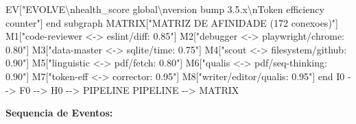 \documentclass[
  12pt,
]{article}
\newenvironment{Shaded}{}{}
\newcommand{\NormalTok}[1]{#1}
\begin{document}
\begin{Shaded}
\begin{Highlighting}[]
\NormalTok{EV["EVOLVE\textbackslash{}nhealth\_score global\textbackslash{}nversion bump 3.5.x\textbackslash{}nToken efficiency counter"]}
\NormalTok{end}
\NormalTok{subgraph MATRIX["MATRIZ DE AFINIDADE (172 conexoes)"]}
\NormalTok{M1["code{-}reviewer \textless{}{-}\textgreater{} eslint/diff: 0.85"]}
\NormalTok{M2["debugger \textless{}{-}\textgreater{} playwright/chrome: 0.80"]}
\NormalTok{M3["data{-}master \textless{}{-}\textgreater{} sqlite/time: 0.75"]}
\NormalTok{M4["scout \textless{}{-}\textgreater{} filesystem/github: 0.90"]}
\NormalTok{M5["linguistic \textless{}{-}\textgreater{} pdf/fetch: 0.80"]}
\NormalTok{M6["qualis \textless{}{-}\textgreater{} pdf/seq{-}thinking: 0.90"]}
\NormalTok{M7["token{-}eff \textless{}{-}\textgreater{} corrector: 0.95"]}
\NormalTok{M8["writer/editor/qualis: 0.95"]}
\NormalTok{end}
\NormalTok{I0 {-}{-}\textgreater{} F0 {-}{-}\textgreater{} H0 {-}{-}\textgreater{} PIPELINE}
\NormalTok{PIPELINE {-}{-}\textgreater{} MATRIX}
\end{Highlighting}
\end{Shaded}

\textbf{Sequencia de Eventos:}
\end{document}
